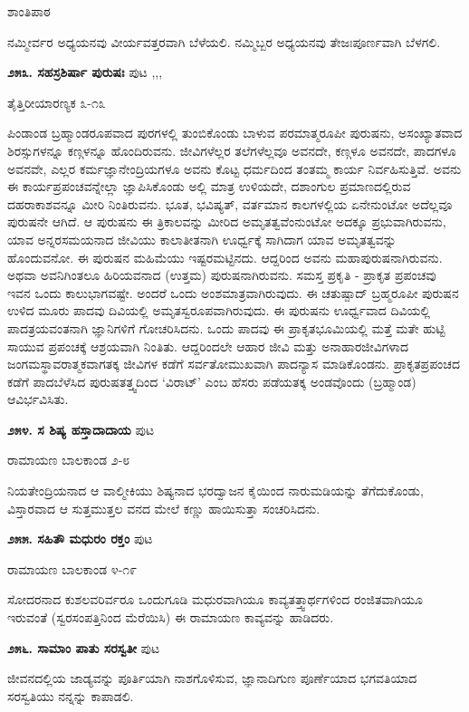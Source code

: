 \hfill ಶಾಂತಿಪಾಠ

ನಮ್ಮೀರ್ವರ ಅಧ್ಯಯನವು ವೀರ್ಯವತ್ತರವಾಗಿ ಬೆಳೆಯಲಿ. ನಮ್ಮಿಬ್ಬರ ಅಧ್ಯಯನವು ತೇಜಃಪೂರ್ಣವಾಗಿ ಬೆಳಗಲಿ.

\medskip
\noindent\textbf{೨೫೩. ಸಹಸ್ರಶಿರ್ಷಾ ಪುರುಷಃ} \hfill ಪುಟ \pageref{108a},\pageref{150c},\pageref{218a},\pageref{249d}

\hfill ತೈತ್ತಿರೀಯಾರಣ್ಯಕ ೩-೧೩

ಪಿಂಡಾಂಡ ಬ್ರಹ್ಮಾಂಡರೂಪವಾದ ಪುರಗಳಲ್ಲಿ ತುಂಬಿಕೊಂಡು ಬಾಳುವ ಪರಮಾತ್ಮರೂಪೀ ಪುರುಷನು, ಅಸಂಖ್ಯಾತವಾದ ಶಿರಸ್ಸುಗಳನ್ನೂ ಕಣ್ಗಳನ್ನೂ ಹೊಂದಿರುವನು. ಜೀವಿಗಳೆಲ್ಲರ ತಲೆಗಳೆಲ್ಲವೂ ಅವನದೇ, ಕಣ್ಗಳೂ ಅವನದೇ, ಪಾದಗಳೂ ಅವನವೇ, ಎಲ್ಲರ ಕರ್ಮಜ್ಞಾನೇಂದ್ರಿಯಗಳೂ ಅವನು ಕೊಟ್ಟ ಧರ್ಮದಿಂದ ತಂತಮ್ಮ ಕಾರ್ಯ ನಿರ್ವಹಿಸುತ್ತಿವೆ. ಅವನು ಈ ಕಾರ್ಯಪ್ರಪಂಚವನ್ನೇಲ್ಲಾ ಜ್ಞಾಪಿಸಿಕೊಂಡು ಅಲ್ಲಿ ಮಾತ್ರ ಉಳಿಯದೇ, ದಶಾಂಗುಲ ಪ್ರಮಾಣದಲ್ಲಿರುವ ದಹರಾಕಾಶವನ್ನೂ ಮೀರಿ ನಿಂತಿರುವನು. ಭೂತ, ಭವಿಷ್ಯತ್, ವರ್ತಮಾನ ಕಾಲಗಳಲ್ಲಿಯ ಏನೇನುಂಟೋ ಅದೆಲ್ಲವೂ ಪುರುಷನೇ ಆಗಿದೆ. ಆ ಪುರುಷನು ಈ ತ್ರಿಕಾಲವನ್ನು ಮೀರಿದ ಅಮೃತತ್ವವೆಂನುಂಟೋ ಅದಕ್ಕೂ ಪ್ರಭುವಾಗಿರುವನು, ಯಾವ ಅನ್ನರಸಮಯನಾದ ಜೀವಿಯು ಕಾಲಾತೀತನಾಗಿ ಊರ್ಧ್ವಕ್ಕೆ ಸಾಗಿದಾಗ ಯಾವ ಅಮೃತತ್ವವನ್ನು ಹೊಂದುವನೋ. ಈ ಪುರುಷನ ಮಹಿಮೆಯು ಇಷ್ಟರಮಟ್ಟಿನದು. ಆದ್ದರಿಂದ ಅವನು ಮಹಾಪುರುಷನಾಗಿರುವನು. ಅಥವಾ ಅವನಿಗಿಂತಲೂ ಹಿರಿಯವನಾದ (ಉತ್ತಮ) ಪುರುಷನಾಗಿರುವನು. ಸಮಸ್ತ ಪ್ರಕೃತಿ - ಪ್ರಾಕೃತ ಪ್ರಪಂಚವು ಇವನ ಒಂದು ಕಾಲುಭಾಗವಷ್ಟೇ. ಅಂದರೆ ಒಂದು ಅಂಶಮಾತ್ರವಾಗಿರುವುದು. ಈ ಚತುಷ್ಪಾದ್ ಬ್ರಹ್ಮರೂಪೀ ಪುರುಷನ ಉಳಿದ ಮೂರು ಪಾದವು ದಿವಿಯಲ್ಲಿ ಅಮೃತಸ್ವರೂಪವಾಗಿರುವುದು. ಈ ಪುರುಷನು ಊರ್ಧ್ವವಾದ ದಿವಿಯಲ್ಲಿ ಪಾದತ್ರಯವಂತನಾಗಿ ಜ್ಞಾನಿಗಳಿಗೆ ಗೋಚರಿಸಿದನು. ಒಂದು ಪಾದವು ಈ ಪ್ರಾಕೃತಭೂಮಿಯಲ್ಲಿ ಮತ್ತೆ ಮತೇ ಹುಟ್ಟಿ ಸಾಯುವ ಪ್ರಪಂಚಕ್ಕೆ ಆಶ್ರಯವಾಗಿ ನಿಂತಿತು. ಆದ್ದರಿಂದಲೇ ಆಹಾರ ಜೀವಿ ಮತ್ತು ಅನಾಹಾರಜೀವಿಗಳಾದ ಜಂಗಮಸ್ಥಾವರಾತ್ಮಕವಾಗತಕ್ಕ ಜೀವಿಗಳ ಕಡೆಗೆ ಸರ್ವತೋಮುಖವಾಗಿ ಪಾದನ್ಯಾಸ ಮಾಡಿಕೊಂಡನು. ಪ್ರಾಕೃತಪ್ರಪಂಚದ ಕಡೆಗೆ ಪಾದಬೆಳೆಸಿದ ಪುರುಷತತ್ತ್ವದಿಂದ `ವಿರಾಟ್' ಎಂಬ ಹೆಸರು ಪಡೆಯತಕ್ಕ ಅಂಡವೊಂದು (ಬ್ರಹ್ಮಾಂಡ) ಆವಿರ್ಭವಿಸಿತು.

\medskip
\noindent\textbf{೨೫೪. ಸ ಶಿಷ್ಯ ಹಸ್ತಾದಾದಾಯ} \hfill ಪುಟ \pageref{198b}

\hfill ರಾಮಾಯಣ ಬಾಲಕಾಂಡ ೨-೮

ನಿಯತೇಂದ್ರಿಯನಾದ ಆ ವಾಲ್ಮೀಕಿಯು ಶಿಷ್ಯನಾದ ಭರದ್ವಾಜನ ಕೈಯಿಂದ ನಾರುಮಡಿಯನ್ನು ತೆಗೆದುಕೊಂಡು, ವಿಸ್ತಾರವಾದ ಆ ಸುತ್ತಮುತ್ತಲ ವನದ ಮೇಲೆ ಕಣ್ಣು ಹಾಯಿಸುತ್ತಾ ಸಂಚರಿಸಿದನು.

\medskip
\noindent\textbf{೨೫೫. ಸಹಿತೌ ಮಧುರಂ ರಕ್ತಂ} \hfill ಪುಟ \pageref{189b}

\hfill ರಾಮಾಯಣ ಬಾಲಕಾಂಡ ೪-೧೯

ಸೋದರನಾದ ಕುಶಲವರಿರ್ವರೂ ಒಂದುಗೂಡಿ ಮಧುರವಾಗಿಯೂ ಕಾವ್ಯತತ್ತ್ವಾರ್ಥಗಳಿಂದ ರಂಜಿತವಾಗಿಯೂ ಇರುವಂತೆ (ಸ್ವರಸಂಪತ್ತಿನಿಂದ ಮೆರೆಯಿಸಿ) ಈ ರಾಮಾಯಣ ಕಾವ್ಯವನ್ನು ಹಾಡಿದರು.

\medskip
\noindent\textbf{೨೫೬. ಸಾಮಾಂ ಪಾತು ಸರಸ್ವತೀ} \hfill ಪುಟ \pageref{100a}

\hfill ಜೀವನದಲ್ಲಿಯ ಜಾಡ್ಯವನ್ನು ಪೂರ್ತಿಯಾಗಿ ನಾಶಗೊಳಿಸುವ, ಜ್ಞಾನಾದಿಗುಣ ಪೂರ್ಣೆಯಾದ ಭಗವತಿಯಾದ ಸರಸ್ವತಿಯು ನನ್ನನ್ನು ಕಾಪಾಡಲಿ.

